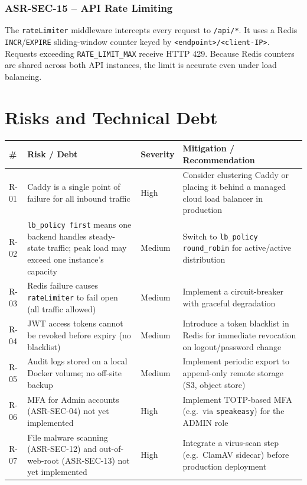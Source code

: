 \documentclass[12pt,a4paper]{article}
\begin{document}
\subsubsection{ASR-SEC-15 -- API Rate Limiting}

The \texttt{rateLimiter} middleware intercepts every request to \texttt{/api/*}. It uses a Redis \texttt{INCR}/\texttt{EXPIRE} sliding-window counter keyed by \texttt{<endpoint>/<client-IP>}. Requests exceeding \texttt{RATE\_LIMIT\_MAX} receive HTTP 429. Because Redis counters are shared across both API instances, the limit is accurate even under load balancing.

\section{Risks and Technical Debt}

\begin{longtable}{C{0.6cm} L{4cm} C{1.5cm} L{7.5cm}}
  \toprule
  \textbf{\#} & \textbf{Risk / Debt} & \textbf{Severity} & \textbf{Mitigation / Recommendation} \\
  \midrule
  \endhead
  \bottomrule
  \endlastfoot

  R-01 & Caddy is a single point of failure for all inbound traffic & High & Consider clustering Caddy or placing it behind a managed cloud load balancer in production \\
  R-02 & \texttt{lb\_policy first} means one backend handles steady-state traffic; peak load may exceed one instance's capacity & Medium & Switch to \texttt{lb\_policy round\_robin} for active/active distribution \\
  R-03 & Redis failure causes \texttt{rateLimiter} to fail open (all traffic allowed) & Medium & Implement a circuit-breaker with graceful degradation \\
  R-04 & JWT access tokens cannot be revoked before expiry (no blacklist) & Medium & Introduce a token blacklist in Redis for immediate revocation on logout/password change \\
  R-05 & Audit logs stored on a local Docker volume; no off-site backup & Medium & Implement periodic export to append-only remote storage (S3, object store) \\
  R-06 & MFA for Admin accounts (ASR-SEC-04) not yet implemented & High & Implement TOTP-based MFA (e.g.\ via \texttt{speakeasy}) for the ADMIN role \\
  R-07 & File malware scanning (ASR-SEC-12) and out-of-web-root (ASR-SEC-13) not yet implemented & High & Integrate a virus-scan step (e.g.\ ClamAV sidecar) before production deployment \\
\end{longtable}
\end{document}
